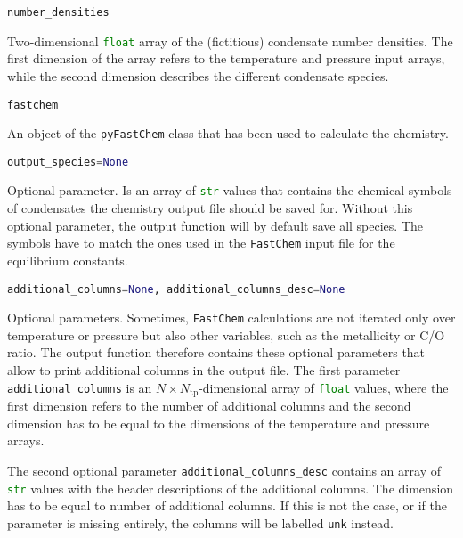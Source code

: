 \documentclass[numbers=noenddot]{aux/fcmanual}
\newcommand{\fc}{\texttt{FastChem}\xspace}
\newcommand{\pfc}{\texttt{pyFastChem}\xspace}
\begin{document}
\bigbreak

\lstinline[language=Python]!number_densities!
\begin{addmargin}[25pt]{0pt}
	Two-dimensional \lstinline[language=Python]!float! array of the (fictitious) condensate number densities. The first dimension of the array refers to the temperature and pressure input arrays, while the second dimension describes the different condensate species.
\end{addmargin}


\bigbreak

\lstinline[language=Python]!fastchem!
\begin{addmargin}[25pt]{0pt}
	An object of the \pfc class that has been used to calculate the chemistry. 
\end{addmargin}


\bigbreak

\lstinline[language=Python]!output_species=None!
\begin{addmargin}[25pt]{0pt}
	Optional parameter. Is an array of \lstinline[language=Python]!str! values that contains the chemical symbols of condensates the chemistry output file should be saved for. Without this optional parameter, the output function will by default save all species. The symbols have to match the ones used in the \fc input file for the equilibrium constants.
\end{addmargin}

\bigbreak

\lstinline[language=Python]!additional_columns=None, additional_columns_desc=None!
\begin{addmargin}[25pt]{0pt}
	Optional parameters. Sometimes, \fc calculations are not iterated only over temperature or pressure but also other variables, such as the metallicity or C/O ratio. The output function therefore contains these optional parameters that allow to print additional columns in the output file. The first parameter \lstinline[language=Python]!additional_columns! is an $N\times N_\mathrm{tp}$-dimensional array of \lstinline[language=Python]!float! values, where the first dimension refers to the number of additional columns and the second dimension has to be equal to the dimensions of the temperature and pressure arrays. 
	
	The second optional parameter \lstinline[language=Python]!additional_columns_desc! contains an array of \lstinline[language=Python]!str! values with the header descriptions of the additional columns. The dimension has to be equal to number of additional columns. If this is not the case, or if the parameter is missing entirely, the columns will be labelled \texttt{unk} instead.
\end{addmargin}
\end{document}
